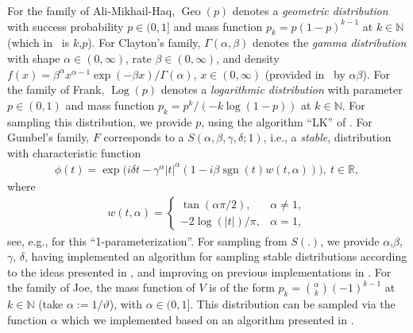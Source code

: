 \documentclass[nojss,article]{jss}
\theoremstyle{mythmstyle}
\newcommand*{\R}{\proglang{R}}%
\newcommand*{\IN}{\mathbb{N}}
\newcommand*{\IR}{\mathbb{R}}
\newcommand*{\sgn}{\operatorname*{sgn}}
\newcommand*{\vt}{\vartheta}
\newcommand*{\Geo}{\operatorname*{Geo}}
\newcommand*{\Log}{\operatorname*{Log}}
\begin{document}
For the family of Ali-Mikhail-Haq, $\Geo(p)$ denotes a \textit{geometric
  distribution} with success probability $p\in(0,1]$ and mass function
$p_k=p(1-p)^{k-1}$ at $k\in\IN$ (which in \R\ is $k$,$p$\code{)}).
%
For Clayton's family, $\Gamma(\alpha,\beta)$ denotes the \textit{gamma
  distribution} with shape $\alpha\in(0,\infty)$, rate
$\beta\in(0,\infty)$, and density
$f(x)=\beta^\alpha x^{\alpha-1}\exp(-\beta x)/\Gamma(\alpha)$, $x\in(0,\infty)$
(provided in \R\ by $\alpha$$\beta$\code{)}).
%
For the family of Frank, $\Log(p)$ denotes a
\textit{logarithmic distribution} with parameter $p\in(0,1)$ and mass
function $p_k=p^k/(-k\log(1-p))$ at $k\in\IN$. For sampling this
distribution, we provide $p$\code{)}, using the algorithm
``LK'' of \citet{kemp1981}.
%
For Gumbel's family, $F$ corresponds to a $S(\alpha, \beta, \gamma, \delta; 1)$, i.e., a \textit{stable}, distribution with characteristic function
\begin{align}
	\phi(t)=\exp\bigl(i\delta t-\gamma^\alpha\lvert t\rvert^\alpha(1-i\beta\sgn(t)w(t,\alpha))\bigr),\ t\in\IR,
\end{align}
where
\begin{align*}
	w(t,\alpha)=\begin{cases}
			\tan(\alpha\pi/2),&\alpha\neq1,\\
			-2\log(\lvert t\rvert)/\pi,&\alpha=1,
		\end{cases}
\end{align*}
see, e.g., \citet[p.\ 8]{nolan2009} for this ``1-parameterization''. For
sampling from $S(.)$, we provide
$\alpha$,$\beta$,$\gamma$, $\delta$,
having implemented an algorithm for sampling stable distributions according
to the ideas presented in \citet{chambersmallowsstuck1976}, and
improving on previous implementations in \R.
%
For the family of Joe, the mass function of $V$ is of the form
$p_k=\binom{\alpha}{k}(-1)^{k-1}$ at $k\in\IN$ (take $\alpha:=1/\vt$), with
$\alpha\in(0,1]$. This distribution can be sampled via the \R{} function
$\alpha$\code{)} which we implemented based on an algorithm
presented in \citet{hofert2010a}.
\end{document}
